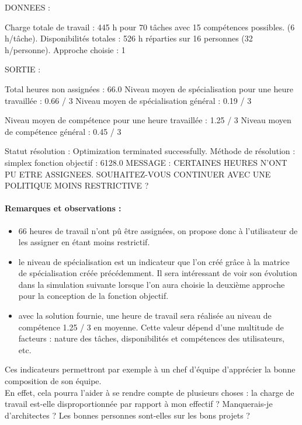 \documentclass[12pt]{article}
\newenvironment{code}%
   {\snugshade\verbatim}%
   {\endverbatim\endsnugshade}
\begin{document}
\begin{code}
DONNEES :

Charge totale de travail   : 445 h pour 70 tâches avec 15 compétences possibles.
							 (6 h/tâche).
Disponibilités totales     : 526 h réparties sur 16 personnes
							 (32 h/personne).
Approche choisie : 1

SORTIE :

Total heures non assignées : 66.0
Niveau moyen de spécialisation pour une heure travaillée : 0.66 / 3
Niveau moyen de spécialisation général : 0.19 / 3

Niveau moyen de compétence pour une heure travaillée     : 1.25 / 3
Niveau moyen de compétence général : 0.45 / 3

Statut résolution : Optimization terminated successfully.
Méthode de résolution      : simplex
fonction objectif          : 6128.0
MESSAGE : CERTAINES HEURES N'ONT PU ETRE ASSIGNEES. SOUHAITEZ-VOUS CONTINUER 
          AVEC UNE POLITIQUE MOINS RESTRICTIVE ?
\end{code}

\paragraph{Remarques et observations :}
\begin{itemize}
\item 66 heures de travail n'ont pû être assignées, on propose donc à l'utilisateur de les assigner en étant moins restrictif.
\item le niveau de spécialisation est un indicateur que l'on créé grâce à la matrice de spécialisation créée précédemment. Il sera intéressant de voir son évolution dans la simulation suivante lorsque l'on aura choisie la deuxième approche pour la conception de la fonction objectif.
\item avec la solution fournie, une heure de travail sera réalisée au niveau de compétence 1.25 / 3 en moyenne. Cette valeur dépend d'une multitude de facteurs : nature des tâches, disponibilités et compétences des utilisateurs, etc.\\

\end{itemize}




Ces indicateurs permettront par exemple à un chef d'équipe d'apprécier la bonne composition de son équipe.\\
En effet, cela pourra l'aider à se rendre compte de plusieurs choses : la charge de travail est-elle disproportionnée par rapport à mon effectif ? Manquerais-je d'architectes ? Les bonnes personnes sont-elles sur les bons projets ?\\
\end{document}

